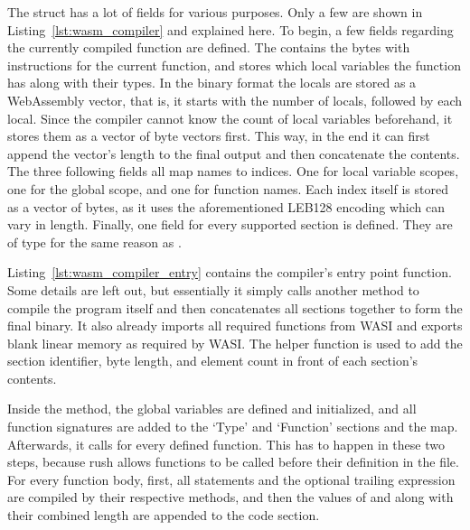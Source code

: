 The  struct has a lot of fields for various purposes.
Only a few are shown in Listing~\ref{lst:wasm_compiler} and explained here.
To begin, a few fields regarding the currently compiled function are defined.
The  contains the bytes with instructions for the current function, and  stores which local variables the function has along with their types.
In the binary format the locals are stored as a WebAssembly vector, that is, it starts with the number of locals, followed by each local.
Since the compiler cannot know the count of local variables beforehand, it stores them as a vector of byte vectors first.
This way, in the end it can first append the vector's length to the final output and then concatenate the contents.
The three following fields all map names to indices.
One for local variable scopes, one for the global scope, and one for function names.
Each index itself is stored as a vector of bytes, as it uses the aforementioned LEB128 encoding which can vary in length.
Finally, one field for every supported section is defined.
They are of type  for the same reason as .


Listing~\ref{lst:wasm_compiler_entry} contains the compiler's entry point function.
Some details are left out, but essentially it simply calls another method to compile the program itself and then concatenates all sections together to form the final binary.
It also already imports all required functions from WASI and exports blank linear memory as required by WASI.
The  helper function is used to add the section identifier, byte length, and element count in front of each section's contents.


Inside the  method, the global variables are defined and initialized, and all function signatures are added to the `Type' and `Function' sections and the  map.
Afterwards, it calls  for every defined function.
This has to happen in these two steps, because rush allows functions to be called before their definition in the file.
For every function body, first, all statements and the optional trailing expression are compiled by their respective methods, and then the values of  and  along with their combined length are appended to the code section.

